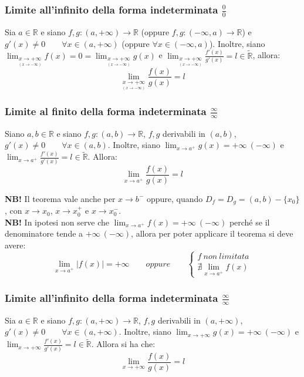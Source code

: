 \documentclass{article}
\begin{document}
\subsubsection{Limite all'infinito della forma indeterminata $\frac{0}{0}$}
Sia $a \in \mathbb{R}$ e siano $f, g: (a, +\infty) \xrightarrow{} \mathbb{R}$ (oppure $f, g: (-\infty, a) \xrightarrow{} \mathbb{R}$) e $g'(x) \neq 0 \qquad \forall x \in (a, +\infty)$ (oppure $\forall x \in (-\infty, a)$). Inoltre, siano $\lim_{\underset{\scriptstyle (x \to -\infty)}{x \to +\infty}} f(x) = 0 = \lim_{\underset{\scriptstyle (x \to -\infty)}{x \to +\infty}} g(x)$ e $\lim_{\underset{\scriptstyle (x \to -\infty)}{x \to +\infty}} \frac{f'(x)}{g'(x)} = l \in \widetilde{\mathbb{R}}$, allora:
\begin{equation*}
    \lim_{\underset{\scriptstyle (x \to -\infty)}{x \to +\infty}} \frac{f(x)}{g(x)} = l
\end{equation*}

\subsubsection{Limite al finito della forma indeterminata $\frac{\infty}{\infty}$}
Siano $a, b \in \mathbb{R}$ e siano $f, g: (a ,b) \xrightarrow{} \mathbb{R}$, $f, g$ derivabili in $(a, b)$, $g'(x) \neq 0 \qquad \forall x \in (a, b)$. Inoltre, siano $\lim_{x \to a^+} g(x) = +\infty \ (- \infty)$ e $\lim_{x \to a^+} \frac{f'(x)}{g'(x)} = l \in \widetilde{\mathbb{R}}$. Allora:
\begin{equation*}
    \lim_{x \to a^+} \frac{f(x)}{g(x)} = l
\end{equation*}

\noindent\textbf{NB!} Il teorema vale anche per $x \to b^-$ oppure, quando $D_f = D_g = (a, b) - \{x_0\}$, con $x \to x_0$, $x \to x_0^+$ e $x \to x_0^-$.\\

\noindent\textbf{NB!} In ipotesi non serve che $\lim_{x \to a^+} f(x) = +\infty \ (-\infty)$ perché se il denominatore tende a $+\infty \ (-\infty)$, allora per poter applicare il teorema si deve avere:
\begin{equation*}
    \lim_{x \to a^+} |f(x)| = +\infty \qquad oppure \qquad \begin{cases}
        f \ non \ limitata \\
        \nexists \lim_{x \to a^+} f(x)
    \end{cases}
\end{equation*}

\subsubsection{Limite all'infinito della forma indeterminata $\frac{\infty}{\infty}$}
Sia $a \in \mathbb{R}$ e siano $f, g: (a, +\infty) \xrightarrow{} \mathbb{R}$, $f, g$ derivabili in $(a, +\infty)$, $g'(x) \neq 0 \qquad \forall x \in (a, +\infty)$. Inoltre, siano $\lim_{x \to +\infty} g(x) = +\infty \ (-\infty)$ e $\lim_{x \to +\infty} \frac{f'(x)}{g'(x)} = l \in \widetilde{\mathbb{R}}$. Allora si ha che:
\begin{equation*}
    \lim_{x \to +\infty} \frac{f(x)}{g(x)} = l
\end{equation*}
\end{document}
